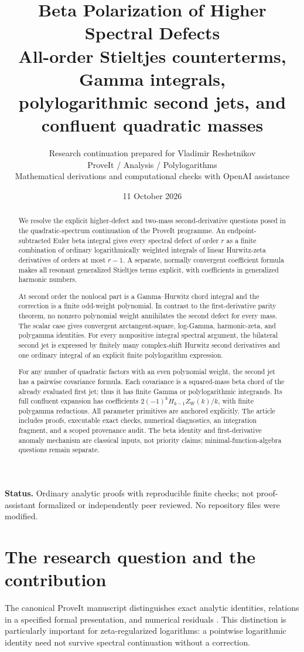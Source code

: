 \documentclass[11pt]{article}
\title{\textbf{Beta Polarization of Higher Spectral Defects}\\[7pt]
\large All-order Stieltjes counterterms, Gamma integrals,\\
polylogarithmic second jets, and confluent quadratic masses}
\author{Research continuation prepared for Vladimir Reshetnikov\\
\small ProveIt / Analysis / Polylogarithms\\
\small Mathematical derivations and computational checks with OpenAI assistance}
\date{11 October 2026}
\numberwithin{equation}{section}
\theoremstyle{definition}\newtheorem{definition}[theorem]{Definition}
\theoremstyle{remark}\newtheorem{remark}[theorem]{Remark}
\begin{document}
\maketitle
\begin{abstract}
We resolve the explicit higher-defect and two-mass second-derivative
questions posed in the quadratic-spectrum continuation of the ProveIt
programme. An endpoint-subtracted Euler beta integral gives every
spectral defect of order $r$ as a finite combination of ordinary
logarithmically weighted integrals of linear Hurwitz-zeta derivatives of
orders at most $r-1$. A separate, normally convergent coefficient formula
makes all resonant generalized Stieltjes terms explicit, with coefficients
in generalized harmonic numbers.

At second order the nonlocal part is a Gamma--Hurwitz chord integral and
the correction is a finite odd-weight polynomial. In contrast to the
first-derivative parity theorem, no nonzero polynomial weight annihilates
the second defect for every mass. The scalar case gives convergent
arctangent-square, log-Gamma, harmonic-zeta, and polygamma identities.
For every nonpositive integral spectral argument, the bilateral second
jet is expressed by finitely many complex-shift Hurwitz second derivatives
and one ordinary integral of an explicit finite polylogarithm expression.

For any number of quadratic factors with an even polynomial weight, the
second jet has a pairwise covariance formula. Each covariance is a
squared-mass beta chord of the already evaluated first jet; thus it has
finite Gamma or polylogarithmic integrands. Its full confluent expansion
has coefficients $2(-1)^kH_{k-1}Z_W(k)/k$, with finite polygamma reductions.
All parameter primitives are anchored explicitly. The article includes
proofs, executable exact checks, numerical diagnostics, an integration
fragment, and a scoped provenance audit. The beta identity and
first-derivative anomaly mechanism are classical inputs, not priority
claims; minimal-function-algebra questions remain separate.
\end{abstract}
\medskip
\noindent\textbf{Status.} Ordinary analytic proofs with reproducible
finite checks; not proof-assistant formalized or independently peer reviewed.
No repository files were modified.
\clearpage
\tableofcontents
\clearpage

\section{The research question and the contribution}\label{hsd:sec:scope}
The canonical ProveIt manuscript distinguishes exact analytic identities,
relations in a specified formal presentation, and numerical residuals
\cite{hsd:repo}. This distinction is particularly important for
zeta-regularized logarithms: a pointwise logarithmic identity need not
survive spectral continuation without a correction.
\end{document}
